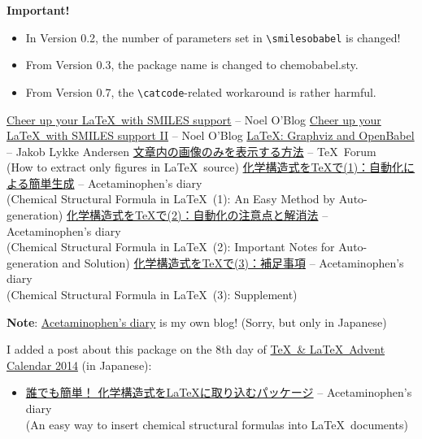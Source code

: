 \documentclass[12pt]{ltjsarticle}
\begin{document}
\textbf{Important!}
\begin{itemize}
\item In Version 0.2, the number of parameters set in \verb|\smilesobabel| is changed!
\item From Version 0.3, the package name is changed to \textsf{chemobabel.sty}.
\item From Version 0.7, the \verb|\catcode|-related workaround is rather harmful.
\end{itemize}

\clearpage

\begin{thebibliography}{9}
\href{http://baoilleach.blogspot.jp/2012/03/cheer-up-your-latex-with-smiles-support.html}{Cheer up your \LaTeX\ with SMILES support} -- Noel O'Blog
\href{http://baoilleach.blogspot.jp/2012/04/cheer-up-your-latex-with-smiles-support.html}{Cheer up your \LaTeX\ with SMILES support II} -- Noel O'Blog
\href{http://imada.sdu.dk/~jlandersen/}{\LaTeX: Graphviz and OpenBabel} -- Jakob Lykke Andersen
\href{http://oku.edu.mie-u.ac.jp/tex/mod/forum/discuss.php?d=1411}{文章内の画像のみを表示する方法} -- \TeX\ Forum \\
(How to extract only figures in \LaTeX\ source)
\href{http://acetaminophen.hatenablog.com/entry/2014/11/02/130624}{化学構造式を\TeX で(1)：自動化による簡単生成} -- Acetaminophen's diary \\
(Chemical Structural Formula in \LaTeX\ (1): An Easy Method by Auto-generation)
\href{http://acetaminophen.hatenablog.com/entry/2014/11/02/130624}{化学構造式を\TeX で(2)：自動化の注意点と解消法} -- Acetaminophen's diary \\
(Chemical Structural Formula in \LaTeX\ (2): Important Notes for Auto-generation and Solution)
\href{http://acetaminophen.hatenablog.com/entry/2014/11/05/135927}{化学構造式を\TeX で(3)：補足事項} -- Acetaminophen's diary \\
(Chemical Structural Formula in \LaTeX\ (3): Supplement)
\end{thebibliography}

\noindent
\textbf{Note}: \href{http://acetaminophen.hatenablog.com/}{Acetaminophen's diary} is my own blog! (Sorry, but only in Japanese)

I added a post about this package on the 8th day of \href{http://www.adventar.org/calendars/553}{\TeX\ \& \LaTeX\ Advent Calendar 2014} (in Japanese):
\begin{itemize}
\item \href{http://acetaminophen.hatenablog.com/entry/2014/12/08/053519}{誰でも簡単！ 化学構造式を\LaTeX に取り込むパッケージ} -- Acetaminophen's diary \\
(An easy way to insert chemical structural formulas into \LaTeX\ documents)
\end{itemize}
\end{document}
